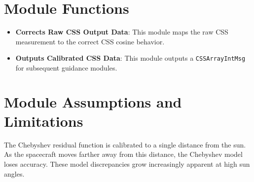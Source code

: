 

\section{Module Functions}

\begin{itemize}
	\item \textbf{Corrects Raw CSS Output Data}: This module maps the raw CSS measurement to the correct CSS cosine behavior. 
	\item \textbf{Outputs Calibrated CSS Data}: This module outputs a \verb~CSSArrayIntMsg~ for subsequent guidance modules.
\end{itemize}

\section{Module Assumptions and Limitations}
The Chebyshev residual function is calibrated to a single distance from the sun. As the spacecraft moves farther away from this distance, the Chebyshev model loses accuracy. These model discrepancies grow increasingly apparent at high sun angles.
